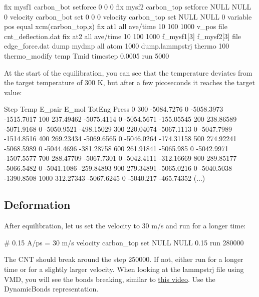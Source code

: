 \begin{lcverbatim}
fix mysf1 carbon_bot setforce 0 0 0
fix mysf2 carbon_top setforce NULL NULL 0
velocity carbon_bot set 0 0 0
velocity carbon_top set NULL NULL 0
variable pos equal xcm(carbon_top,z)
fix at1 all ave/time 10 100 1000 v_pos file cnt_deflection.dat
fix at2 all ave/time 10 100 1000 f_mysf1[3] f_mysf2[3] file edge_force.dat
dump mydmp all atom 1000 dump.lammpstrj
thermo 100
thermo_modify temp Tmid
timestep 0.0005
run 5000
\end{lcverbatim}

\noindent At the start of the equilibration, you can see that the
temperature deviates from the target temperature of 300 K, but
after a few picoseconds it reaches the target value:

\begin{lcverbatim}
Step          Temp          E_pair         E_mol          TotEng         Press     
0   300           -5084.7276      0             -5058.3973     -1515.7017    
100   237.49462     -5075.4114      0             -5054.5671     -155.05545    
200   238.86589     -5071.9168      0             -5050.9521     -498.15029    
300   220.04074     -5067.1113      0             -5047.7989     -1514.8516    
400   269.23434     -5069.6565      0             -5046.0264     -174.31158    
500   274.92241     -5068.5989      0             -5044.4696     -381.28758    
600   261.91841     -5065.985       0             -5042.9971     -1507.5577    
700   288.47709     -5067.7301      0             -5042.4111     -312.16669    
800   289.85177     -5066.5482      0             -5041.1086     -259.84893    
900   279.34891     -5065.0216      0             -5040.5038     -1390.8508    
1000   312.27343     -5067.6245      0             -5040.217      -465.74352
(...)
\end{lcverbatim}

\noindent \subsection{Deformation}

After equilibration, let us set the velocity to 30 m/s and run for
a longer time:

\begin{lcverbatim}
# 0.15 A/ps = 30 m/s
velocity carbon_top set NULL NULL 0.15
run 280000
\end{lcverbatim}

\noindent The CNT should break around the step 250000. If not, either 
run for a longer time or for a slightly larger velocity.
When looking at the lammpstrj file using VMD, you will see
the bonds breaking, similar to \href{https://www.youtube.com/watch?v=f1ve1j3yA6w}{this video}. Use
the DynamicBonds representation.

